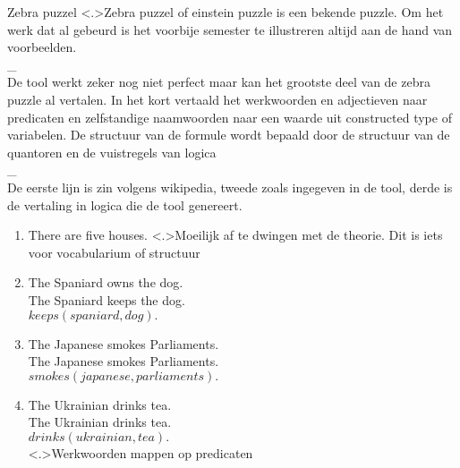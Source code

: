 \documentclass[notes]{beamer}
\newcommand{\hitem}{
	\ppause
	\item
}
\newcommand{\ppause}{\onslide<+>}
\newcommand{\nnote}[1]{\note<.>{#1}}
\begin{document}
  \begin{frame}{Zebra puzzel\cite{ZebraPuzzle}}
    \ppause
    \nnote{Zebra puzzel of einstein puzzle is een bekende puzzle. Om het werk dat al gebeurd is het voorbije semester te illustreren altijd aan de hand van voorbeelden.
    \\ _
    \\ De tool werkt zeker nog niet perfect maar kan het grootste deel van de zebra puzzle al vertalen. In het kort vertaald het werkwoorden en adjectieven naar predicaten en zelfstandige naamwoorden naar een waarde uit constructed type of variabelen. De structuur van de formule wordt bepaald door de structuur van de quantoren en de vuistregels van logica
    \\ _
    \\ De eerste lijn is zin volgens wikipedia, tweede zoals ingegeven in de tool, derde is de vertaling in logica die de tool genereert. \\
    }
    \begin{enumerate}
      \hitem There are five houses.
      \nnote{Moeilijk af te dwingen met de theorie. Dit is iets voor vocabularium of structuur}

      \hitem The Spaniard owns the dog. \\ The Spaniard keeps the dog. \\ $keeps(spaniard,dog).$ \\
      \item The Japanese smokes Parliaments. \\ The Japanese smokes Parliaments. \\ $smokes(japanese,parliaments).$ \\
      \item The Ukrainian drinks tea. \\ The Ukrainian drinks tea. \\ $drinks(ukrainian,tea).$ \\
      \nnote{Werkwoorden mappen op predicaten}
    \end{enumerate}
  \end{frame}
\end{document}
